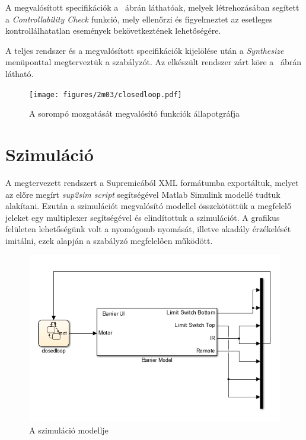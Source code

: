 A megvalósított specifikációk a ~ábrán láthatóak, melyek létrehozásában segített a \textit{Controllability Check} funkció, mely ellenőrzi és figyelmeztet az esetleges kontrollálhatatlan események bekövetkeztének lehetőségére.

A teljes rendszer és a megvalósított specifikációk kijelölése után a \textit{Synthesize} menüponttal megterveztük a szabályzót. Az elkészült rendszer zárt köre a ~ábrán látható.

\begin{figure}
	\centering
	\texttt{[image: figures/2m03/closedloop.pdf]}
	\caption{A sorompó mozgatását megvalósító funkciók állapotgráfja}
	\label{fig:ClosedLoop}
\end{figure}

\section{Szimuláció}
A megtervezett rendszert a Supremicából XML formátumba exportáltuk, melyet az előre megírt \textit{sup2sim script} segítségével Matlab Simulink modellé tudtuk alakítani. Ezután a szimulációt megvalósító modellel összekötöttük a megfelelő jeleket egy multiplexer segítségével és elindítottuk a szimulációt. A grafikus felületen lehetőségünk volt a nyomógomb nyomását, illetve akadály érzékelését imitálni, ezek alapján a szabályzó megfelelően működött.


\begin{figure}
	\centering
	\includegraphics[keepaspectratio]{figures/2m03/b_sim.png}
	\caption{A szimuláció modellje}
	\label{fig:SimModel}
\end{figure}